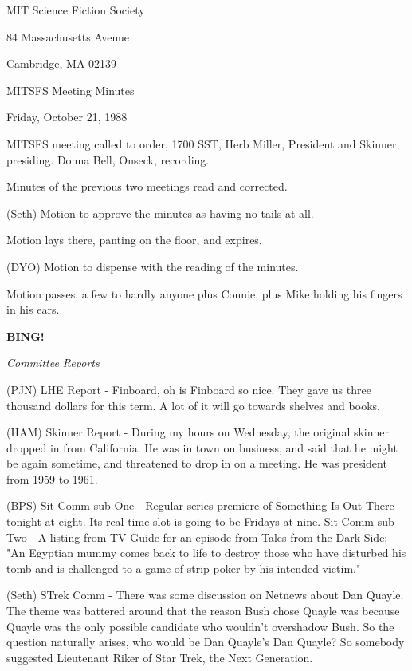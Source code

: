 \documentclass[12pt]{article}
\newcommand{\bing}{{\bf BING!} }
\newcommand{\goto}[1]{\bing \vskip 12pt \centerline{{\em{#1}}}}
\begin{document}
\begin{center}

MIT Science Fiction Society 

84 Massachusetts Avenue

Cambridge, MA 02139

\vspace{12pt}

MITSFS Meeting Minutes 

Friday, October 21, 1988

\end{center}
 
\vspace{18pt}

\setlength{\parskip}{6pt}

\noindent
MITSFS meeting called to order, 1700 SST, Herb Miller, President and Skinner, presiding. Donna Bell, Onseck, recording.

Minutes of the previous two meetings read and corrected.

(Seth) Motion to approve the minutes as having no tails at all.

Motion lays there, panting on the floor, and expires.

(DYO) Motion to dispense with the reading of the minutes.

Motion passes, a few to hardly anyone plus Connie, plus Mike holding his fingers in his ears.

\goto{Committee Reports}

(PJN) LHE Report - Finboard, oh is Finboard so nice. They gave us three thousand dollars for this term. A lot of it will go towards shelves and books.

(HAM) Skinner Report - During my hours on Wednesday, the original skinner dropped in from California. He was in town on business, and said that he might be again sometime, and threatened to drop in on a meeting. He was president from 1959 to 1961.

(BPS) Sit Comm sub One - Regular series premiere of Something Is Out There tonight at eight. Its real time slot is going to be Fridays at nine. Sit Comm sub Two - A listing from TV Guide for an episode from Tales from the Dark Side: "An Egyptian mummy comes back to life to destroy those who have disturbed his tomb and is challenged to a game of strip poker by his intended victim."

(Seth) STrek Comm - There was some discussion on Netnews about Dan Quayle.  The theme was battered around that the reason Bush chose Quayle was because Quayle was the only possible candidate who wouldn't overshadow Bush.  So the question naturally arises, who would be Dan Quayle's Dan Quayle? So somebody suggested Lieutenant Riker of Star Trek, the Next Generation.
\end{document}
